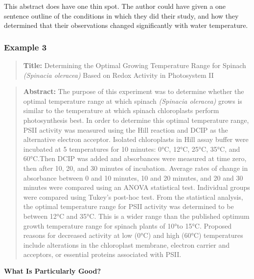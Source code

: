 \documentclass[
]{book}
\begin{document}
This abstract does have one thin spot. The author could have given a one sentence outline of the conditions in which they did their study, and how they determined that their observations changed significantly with water temperature.

\hypertarget{example-3-1}{%
\subsubsection{Example 3}\label{example-3-1}}

\begin{quote}
\textbf{Title:} Determining the Optimal Growing Temperature Range for Spinach \emph{(Spinacia oleracea)} Based on Redox Activity in Photosystem II
\end{quote}

\begin{quote}
\textbf{Abstract:} The purpose of this experiment was to determine whether the optimal temperature range at which spinach \emph{(Spinacia oleracea)} grows is similar to the temperature at which spinach chloroplasts perform photosynthesis best. In order to determine this optimal temperature range, PSII activity was measured using the Hill reaction and DCIP as the alternative electron acceptor. Isolated chloroplasts in Hill assay buffer were incubated at 5 temperatures for 10 minutes: 0°C, 12°C, 25°C, 35°C, and 60°C.Then DCIP was added and absorbances were measured at time zero, then after 10, 20, and 30 minutes of incubation. Average rates of change in absorbance between 0 and 10 minutes, 10 and 20 minutes, and 20 and 30 minutes were compared using an ANOVA statistical test. Individual groups were compared using Tukey's post-hoc test. From the statistical analysis, the optimal temperature range for PSII activity was determined to be between 12°C and 35°C. This is a wider range than the published optimum growth temperature range for spinach plants of 10°to 15°C. Proposed reasons for decreased activity at low (0°C) and high (60°C) temperatures include alterations in the chloroplast membrane, electron carrier and acceptors, or essential proteins associated with PSII.
\end{quote}

\textbf{What Is Particularly Good?}
\end{document}
